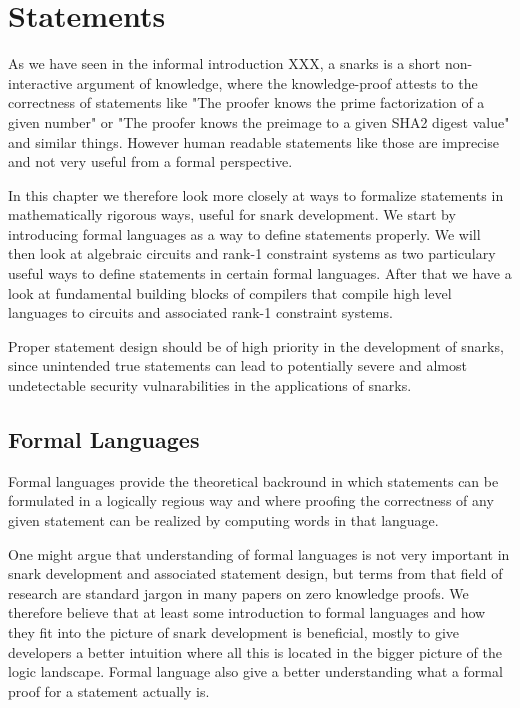 \chapter{Statements}

As we have seen in the informal introduction XXX, a snarks is a short non-interactive argument of knowledge, where the knowledge-proof attests to the correctness of statements like "The proofer knows the prime factorization of a given number" or "The proofer knows the preimage to a given SHA2 digest value" and similar things. However human readable statements like those are imprecise and not very useful from a formal perspective. 

In this chapter we therefore look more closely at ways to formalize statements in mathematically rigorous ways, useful for snark development. We start by introducing formal languages as a way to define statements properly. We will then look at algebraic circuits and rank-1 constraint systems as two particulary useful ways to define statements in certain formal languages. After that we have a look at fundamental building blocks of compilers that compile high level languages to circuits and associated rank-1 constraint systems.

Proper statement design should be of high priority in the development of snarks, since unintended true statements can lead to potentially severe and almost undetectable security vulnarabilities in the applications of snarks.

\section{Formal Languages} Formal languages provide the theoretical backround in which statements can be formulated in a logically regious way and where proofing the correctness of any given statement can be realized by computing words in that language.

One might argue that understanding of formal languages is not very important in snark development and associated statement design, but terms from that field of research are standard jargon in many papers on zero knowledge proofs. We therefore believe that at least some introduction to formal languages and how they fit into the picture of snark development is beneficial, mostly to give developers a better intuition where all this is located in the bigger picture of the logic landscape. Formal language also give a better understanding what a formal proof for a statement actually is.

